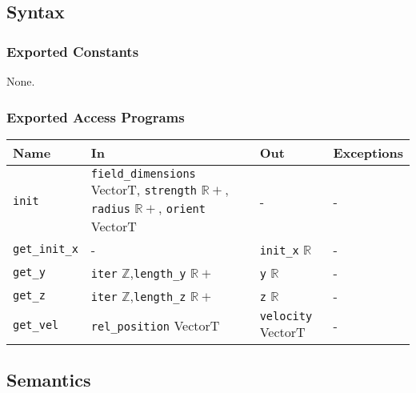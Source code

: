 \documentclass[12pt, titlepage]{article}
\begin{document}
\subsection{Syntax}

\subsubsection{Exported Constants}
None.

\subsubsection{Exported Access Programs}

\begin{center}
\begin{tabular}{p{2cm} p{5.6cm} p{3cm} p{3cm}}
\hline
\textbf{Name} & \textbf{In} & \textbf{Out} & \textbf{Exceptions} \\
\hline
\texttt{init} & \texttt{field\_dimensions} VectorT, \newline\texttt{strength} $\mathbb{R+}$, \newline\texttt{radius} $\mathbb{R+}$, \newline\texttt{orient} VectorT & - & - \\
\texttt{get\_init\_x}& - & \texttt{init\_x} $\mathbb{R}$ & - \\
\texttt{get\_y}& \texttt{iter} $\mathbb{Z}$,\newline\texttt{length\_y} $\mathbb{R+}$ & \texttt{y} $\mathbb{R}$ & - \\
\texttt{get\_z}& \texttt{iter} $\mathbb{Z}$,\newline\texttt{length\_z} $\mathbb{R+}$ & \texttt{z} $\mathbb{R}$ & - \\
\texttt{get\_vel}& \texttt{rel\_position} VectorT & \texttt{velocity} VectorT & - \\
\hline
\end{tabular}
\end{center}

\subsection{Semantics}
\end{document}
